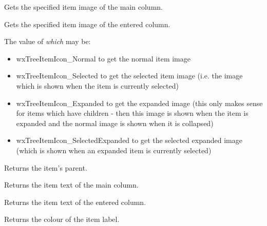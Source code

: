 Gets the specified item image of the main column.


Gets the specified item image of the entered column.

The value of {\it which} may be:

\begin{itemize}\itemsep=0pt
\item{wxTreeItemIcon\_Normal} to get the normal item image
\item{wxTreeItemIcon\_Selected} to get the selected item image (i.e. the image
which is shown when the item is currently selected)
\item{wxTreeItemIcon\_Expanded} to get the expanded image (this only
makes sense for items which have children - then this image is shown when the
item is expanded and the normal image is shown when it is collapsed)
\item{wxTreeItemIcon\_SelectedExpanded} to get the selected expanded image
(which is shown when an expanded item is currently selected)
\end{itemize}

\label{wxtreelistctrlgetitemparent}


Returns the item's parent.

\label{wxtreelistctrlgetitemtext}


Returns the item text of the main column.


Returns the item text of the entered column.

\label{wxtreelistctrlgetitemtextcolour}


Returns the colour of the item label.

\label{wxtreelistctrlgetlastchild}

